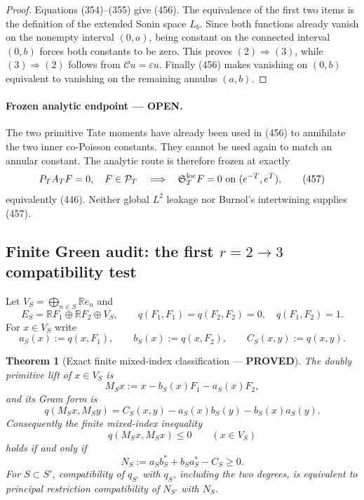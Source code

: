 \documentclass[11pt]{article}
\newtheorem{theorem}{Theorem}
\newcommand{\PROVED}{\textcolor{green!45!black}{\textbf{PROVED}}}
\newcommand{\OPEN}{\textcolor{red!70!black}{\textbf{OPEN}}}
\begin{document}
\begin{proof}
Equations (354)--(355) give (456).  The equivalence of the first two items
is the definition of the extended Sonin space \(L_b\).  Since both functions
already vanish on the nonempty interval \((0,a)\), being constant on the
connected interval \((0,b)\) forces both constants to be zero.  This proves
\((2)\Rightarrow(3)\), while \((3)\Rightarrow(2)\) follows from
\(\mathcal Cu=\varepsilon u\).  Finally (456) makes vanishing on
\((0,b)\) equivalent to vanishing on the remaining annulus \((a,b)\).
\end{proof}

\paragraph{Frozen analytic endpoint --- \OPEN.}
The two primitive Tate moments have already been used in (456) to annihilate
the two inner co-Poisson constants.  They cannot be used again to match an
annular constant.  The analytic route is therefore frozen at exactly
\[
 P_TA_TF=0,\quad F\in\mathcal P_T
 \quad\Longrightarrow\quad
 \mathfrak S_T^{\rm loc}F=0\ \hbox{on }(e^{-T},e^T),
 \tag{457}
\]
equivalently (446).  Neither global \(L^2\) leakage nor Burnol's
intertwining supplies (457).

\subsection{Finite Green audit: the first \(r=2\to3\) compatibility test}

Let \(V_S=\bigoplus_{n\in S}\mathbb Re_n\) and
\[
 E_S=\mathbb RF_1\oplus\mathbb RF_2\oplus V_S,\qquad
 q(F_1,F_1)=q(F_2,F_2)=0,\quad q(F_1,F_2)=1.
\]
For \(x\in V_S\) write
\[
 a_S(x):=q(x,F_1),\qquad b_S(x):=q(x,F_2),\qquad
 C_S(x,y):=q(x,y).
\]

\begin{theorem}[Exact finite mixed-index classification --- \PROVED]
The doubly primitive lift of \(x\in V_S\) is
\begin{equation}
 M_Sx:=x-b_S(x)F_1-a_S(x)F_2,                        \tag{458}
\end{equation}
and its Gram form is
\begin{equation}
 q(M_Sx,M_Sy)
 =C_S(x,y)-a_S(x)b_S(y)-b_S(x)a_S(y).               \tag{459}
\end{equation}
Consequently the finite mixed-index inequality
\[
 q(M_Sx,M_Sx)\le0\qquad(x\in V_S)
\]
holds if and only if
\begin{equation}
 \boxed{
 N_S:=a_Sb_S^*+b_Sa_S^*-C_S\ge0.}                   \tag{460}
\end{equation}
For \(S\subset S'\), compatibility of \(q_{S'}\) with \(q_S\), including
the two degrees, is equivalent to principal restriction compatibility of
\(N_{S'}\) with \(N_S\).
\end{theorem}
\end{document}
